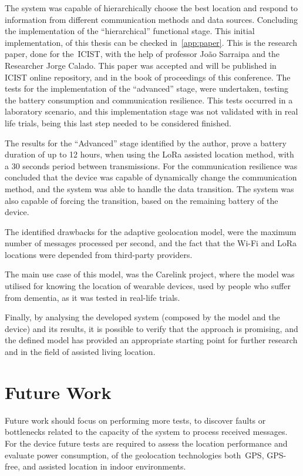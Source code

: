 The system was capable of hierarchically choose the best location and respond to information from different communication methods and data sources. Concluding the implementation of the “hierarchical” functional stage.
This initial implementation, of this thesis can be checked in~\ref{app:paper}. This is the research paper, done for the~\gls{ICIST}, with the help of professor João Sarraipa and the Researcher Jorge Calado. This paper was accepted and will be  published in ICIST online repository, and in the  book of proceedings of this conference. The tests for the implementation of the “advanced” stage, were undertaken, testing the battery consumption and communication resilience. This tests occurred in a laboratory scenario, and this implementation stage was not validated with in real life trials, being this last step needed to be considered finished.

The results for the “Advanced” stage identified by the author, prove a battery duration of up to 12 hours, when using the LoRa assisted location method, with a 30 seconds period between transmissions. For the communication resilience was concluded that the device was capable of dynamically change the communication method, and the system was able to handle the data transition. The system was also capable of forcing the transition, based on the remaining battery of the device.

The identified drawbacks for the adaptive geolocation model, were the maximum number of messages processed per second, and the fact that the Wi-Fi and LoRa locations were depended from third-party providers.


The main use case of this model, was the Carelink project, where the model was utilised for knowing the location of wearable devices, used by people who suffer from dementia, as it was tested in real-life trials.


Finally, by analysing the developed system (composed by the model and the device) and its results, it is possible to verify that the approach is promising, and the defined model has provided an appropriate starting point for further research and in the field of assisted living location.

\section{Future Work}
\label{sec:Future_work}

Future work should focus on performing more tests, to discover faults or bottlenecks related to the capacity of the system to process received messages. For the device future tests are required to assess the location performance and evaluate power consumption, of the geolocation technologies both~\gls{GPS}, GPS-free, and assisted location in indoor environments.

